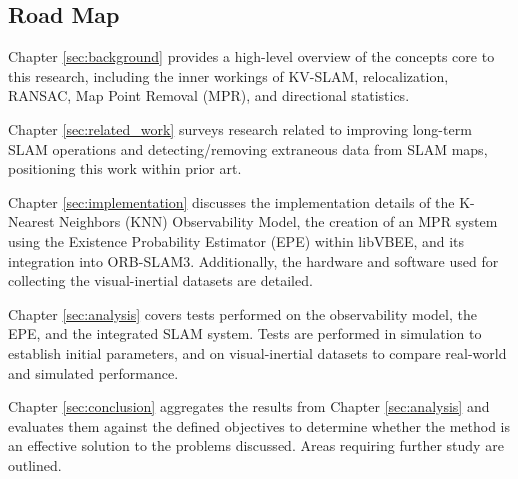 \subsection{Road Map}

Chapter \ref{sec:background} provides a high-level overview of the concepts core to this research, including the inner workings of KV-SLAM, relocalization, RANSAC, Map Point Removal (MPR), and directional statistics.

Chapter \ref{sec:related_work} surveys research related to improving long-term SLAM operations and detecting/removing extraneous data from SLAM maps, positioning this work within prior art.

Chapter \ref{sec:implementation} discusses the implementation details of the K-Nearest Neighbors (KNN) Observability Model, the creation of an MPR system using the Existence Probability Estimator (EPE) within libVBEE, and its integration into ORB-SLAM3. Additionally, the hardware and software used for collecting the visual-inertial datasets are detailed.

Chapter \ref{sec:analysis} covers tests performed on the observability model, the EPE, and the integrated SLAM system. Tests are performed in simulation to establish initial parameters, and on visual-inertial datasets to compare real-world and simulated performance.

Chapter \ref{sec:conclusion} aggregates the results from Chapter \ref{sec:analysis} and evaluates them against the defined objectives to determine whether the method is an effective solution to the problems discussed. Areas requiring further study are outlined.
